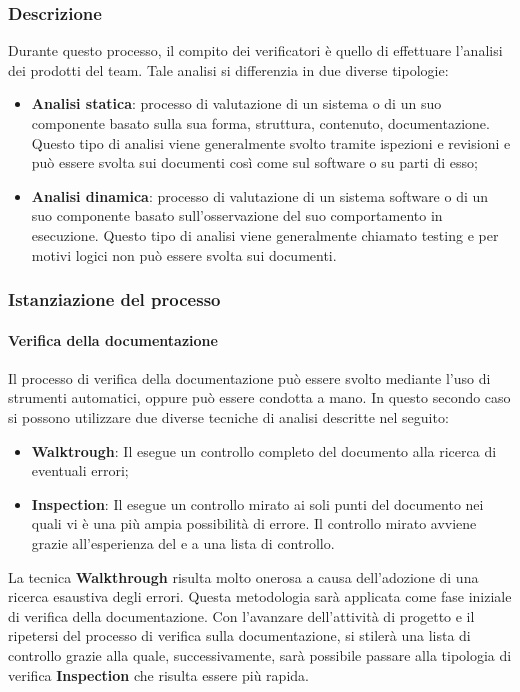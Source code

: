 \subsubsection{Descrizione}
Durante questo processo, il compito dei verificatori è quello di effettuare l'analisi dei prodotti del team. Tale analisi si differenzia in due diverse tipologie:
\begin{itemize}
    \item \textbf{Analisi statica}: processo di valutazione di un sistema o di un suo componente basato sulla sua forma, struttura, contenuto, documentazione. Questo tipo di analisi viene generalmente svolto tramite ispezioni e revisioni e può essere svolta sui documenti così come sul software o su parti di esso;
    \item \textbf{Analisi dinamica}: processo di valutazione di un sistema software o di un suo componente basato sull'osservazione del suo comportamento in esecuzione. Questo tipo di analisi viene generalmente chiamato testing e per motivi logici non può essere svolta sui documenti.
\end{itemize}
\subsubsection{Istanziazione del processo}

\paragraph{Verifica della documentazione}

Il processo di verifica della documentazione può essere svolto mediante l'uso di strumenti automatici, oppure può essere condotta a mano. In questo secondo caso si possono utilizzare due diverse tecniche di analisi descritte nel seguito:
\begin{itemize}
    \item \textbf{Walktrough}: Il \roleVerifierLow{} esegue un controllo completo del documento alla ricerca di eventuali errori;
    \item \textbf{Inspection}: Il \roleVerifierLow{} esegue un controllo mirato ai soli punti del documento nei quali vi è una più ampia possibilità di errore. Il controllo mirato avviene grazie all'esperienza del \roleVerifierLow{} e a una lista di controllo\glo{}.
\end{itemize}
La tecnica \textbf{Walkthrough} risulta molto onerosa a causa dell'adozione di una ricerca esaustiva degli errori. Questa metodologia sarà applicata come fase iniziale di verifica della documentazione. Con l'avanzare dell'attività di progetto e il ripetersi del processo di verifica sulla documentazione, si stilerà una lista di controllo\glo{} grazie alla quale, successivamente, sarà possibile passare alla tipologia di verifica \textbf{Inspection} che risulta essere più rapida.

